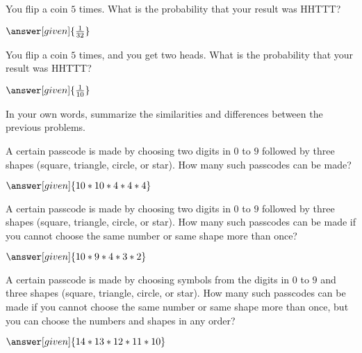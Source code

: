 \documentclass[nooutcomes]{ximera}
\begin{document}
\begin{problem}
	You flip a coin $5$ times.  What is the probability that your result was HHTTT?
	\begin{prompt}
		$\answer[given]{\frac{1}{32}}$
	\end{prompt}
\end{problem}


\begin{problem}
	You flip a coin $5$ times, and you get two heads.  What is the probability that your result was HHTTT?
	\begin{prompt}
		$\answer[given]{\frac{1}{10}}$
	\end{prompt}
\end{problem}

\begin{problem}
In your own words, summarize the similarities and differences between the previous problems.

\begin{freeResponse}
\end{freeResponse}
\end{problem}


\begin{problem}
A certain passcode is made by choosing two digits in $0$ to $9$ followed by three shapes (square, triangle, circle, or star).  How many such passcodes can be made?
\begin{prompt}
	$\answer[given]{10*10*4*4*4}$
\end{prompt}
\end{problem}



\begin{problem}
A certain passcode is made by choosing two digits in $0$ to $9$ followed by three shapes (square, triangle, circle, or star).  How many such passcodes can be made if you cannot choose the same number or same shape more than once?
\begin{prompt}
	$\answer[given]{10*9*4*3*2}$
\end{prompt}
\end{problem}



\begin{problem}
A certain passcode is made by choosing symbols from the digits in $0$ to $9$ and three shapes (square, triangle, circle, or star).  How many such passcodes can be made if you cannot choose the same number or same shape more than once, but you can choose the numbers and shapes in any order?
\begin{prompt}
	$\answer[given]{14*13*12*11*10}$
\end{prompt}
\end{problem}
\end{document}
